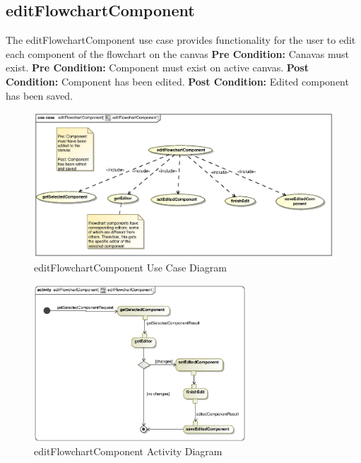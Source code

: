 \documentclass[11pt,a4paper,titlepage]{article}
\begin{document}
\newpage
\subsection{editFlowchartComponent}

The editFlowchartComponent use case provides functionality for the user to edit each component of the flowchart on the canvas \newline\newline
\textbf{Pre Condition:} Canavas must exist.\newline
\textbf{Pre Condition:} Component must exist on active canvas.\newline\newline
\textbf{Post Condition:} Component has been edited.\newline
\textbf{Post Condition:} Edited component has been saved.

\begin{figure}[H]
  \centering
\includegraphics[width=500px]{editFlowchartComponent.eps}
\caption{editFlowchartComponent Use Case Diagram}
\end{figure}

\begin{figure}[H]
  \centering
\includegraphics[width=300px]{editFlowchartComponentActivity.eps}
\caption{editFlowchartComponent Activity Diagram}
\end{figure}
\end{document}

